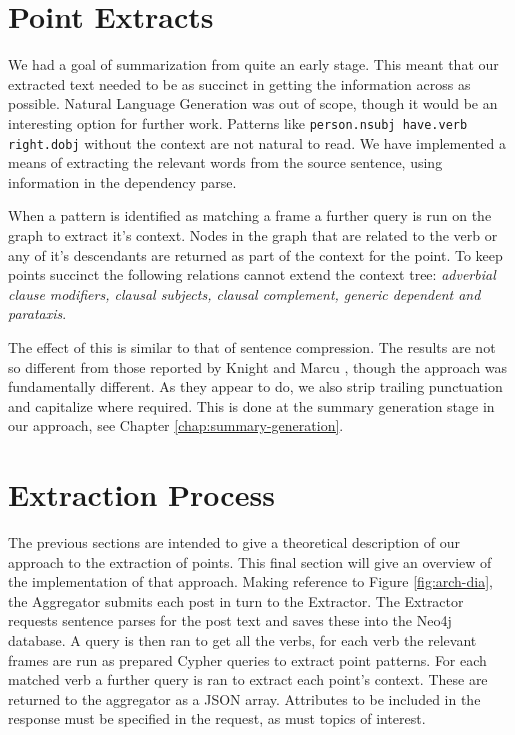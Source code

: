   \section{Point Extracts}
    We had a goal of summarization from quite an early stage. This meant that our extracted text needed to be as succinct in getting the information across as possible. Natural Language Generation was out of scope, though it would be an interesting option for further work. Patterns like \texttt{person.nsubj have.verb right.dobj} without the context are not natural to read. We have implemented a means of extracting the relevant words from the source sentence, using information in the dependency parse.

    When a pattern is identified as matching a frame a further query is run on the graph to extract it's context. Nodes in the graph that are related to the verb or any of it's descendants are returned as part of the context for the point. To keep points succinct the following relations cannot extend the context tree: \textit{adverbial clause modifiers, clausal subjects, clausal complement, generic dependent and parataxis}.

    The effect of this is similar to that of sentence compression. The results are not so different from those reported by Knight and Marcu \cite{knight2000statistics}, though the approach was fundamentally different. As they appear to do, we also strip trailing punctuation and capitalize where required. This is done at the summary generation stage in our approach, see Chapter \ref{chap:summary-generation}.

  \section{Extraction Process}
    The previous sections are intended to give a theoretical description of our approach to the extraction of points. This final section will give an overview of the implementation of that approach.
    Making reference to Figure \ref{fig:arch-dia}, the Aggregator submits each post in turn to the Extractor. The Extractor requests sentence parses for the post text and saves these into the Neo4j database. A query is then ran to get all the verbs, for each verb the relevant frames are run as prepared Cypher queries to extract point patterns. For each matched verb a further query is ran to extract each point's context. These are returned to the aggregator as a JSON array. Attributes to be included in the response must be specified in the request, as must topics of interest.
